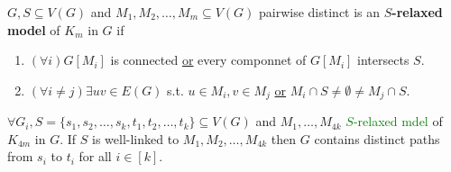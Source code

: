 \begin{defn}
	$G, S \subseteq V(G)$ and $M_{1}, M_{2}, \dots, M_{m} \subseteq V(G)$ pairwise distinct is an \textbf{$S$-relaxed model} of $K_{m}$ in $G$ if
	
	\begin{enumerate}
		\item $(\forall i) G[M_{i}]$ is connected \underline{or} every componnet of $G[M_{i}]$ intersects $S$.
		\item $(\forall i \neq j) \exists uv \in E(G)$ s.t. $u \in M_{i}, v \in M_{j}$ \underline{or} $M_{i} \cap S \neq \emptyset \neq M_{j} \cap S$.
	\end{enumerate}
\end{defn}

\begin{thm}[\textcolor{Green}{Slightly changed}]
	$\forall G_{i}, S = \{s_{1}, s_{2}, \dots, s_{k}, t_{1}, t_{2}, \dots, t_{k}\} \subseteq V(G)$ and $M_{1}, \dots, M_{4k}$ \textcolor{Green}{$S$-relaxed mdel} of $K_{4m}$ in $G$. If $S$  is well-linked to $M_{1}, M_{2}, \dots, M_{4k}$ then $G$ contains distinct paths from $s_{i}$ to $t_{i}$ for all $i \in [k]$.
\end{thm}

